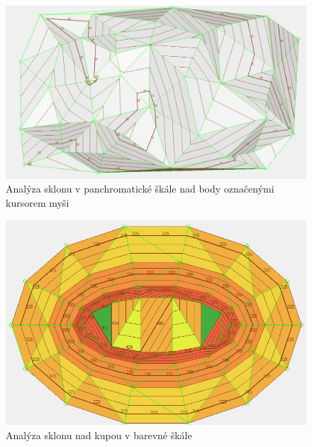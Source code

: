 \documentclass[a4paper,11pt,twoside]{article}
\begin{document}
\begin{figure}[hbt!] 
\begin{center}
\includegraphics[width=15cm]{pictures/dtm_panchromatic_slope.PNG} 
\caption[Analýza sklonu v panchromatické škále nad body označenými kursorem myši]{Analýza sklonu v panchromatické škále nad body označenými kursorem myši}
\label{fig:dtm_panchromatic_slope}
\end{center}
\end{figure}

\vspace{0.2cm}
\begin{figure}[hbt!] 
\begin{center}
\includegraphics[width=13cm]{pictures/hill_colorful_slope.PNG} 
\caption[Analýza sklonu nad kupou v barevné škále]{Analýza sklonu nad kupou v barevné škále}
\label{fig:hill_colorful_slope}
\end{center}
\end{figure}
\end{document}
